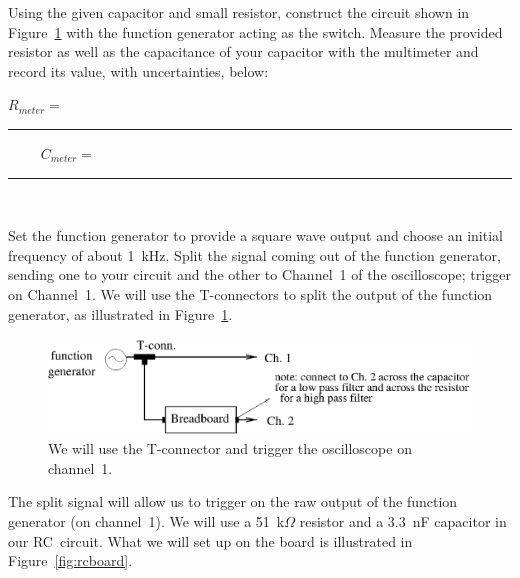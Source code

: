 \noindent Using the given capacitor and small resistor, 
construct the circuit
shown in Figure~\ref{fig:wiring} with the function generator acting as the
switch. Measure the provided resistor as well as the capacitance of your capacitor
with the multimeter and record its value, with uncertainties, below:
\begin{center}
$R_{meter}=$~ \rule{3cm}{.1mm}~~~~
$C_{meter}=$~ \rule{3cm}{.1mm} \\
\end{center}
\noindent Set the function generator to provide a square wave output 
and choose an initial frequency of about 1~kHz. Split the signal coming out of 
the function generator, sending one to your circuit and the other to Channel~1
of the oscilloscope; trigger on Channel~1. 
We will use the T-connectors to split the output of the function generator, as
illustrated in Figure~\ref{fig:wiring}.
\begin{figure}[htb]
\epsfxsize=15cm
\centering 
\includegraphics[scale=0.8]{5_rccircuits/wiring.eps}
\caption{We will use the T-connector and trigger the oscilloscope on 
channel~1.}
\label{fig:wiring}
\end{figure}
The split signal will allow us to trigger on the raw output of the
function generator (on channel~1). We will use a 51~k$\Omega$ resistor and a
3.3~nF capacitor in our RC~circuit.
What we will set up on the board is illustrated in Figure~\ref{fig:rcboard}.

